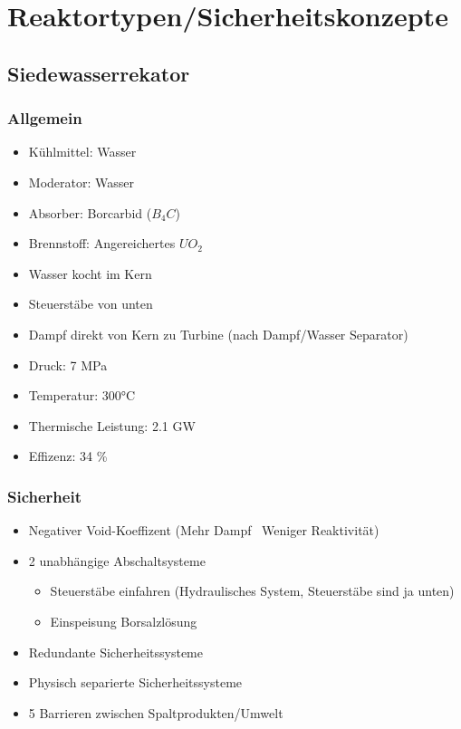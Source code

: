 \documentclass[12pt]{article}
\begin{document}
\thispagestyle{empty}

\section{Reaktortypen/Sicherheitskonzepte}

\subsection{Siedewasserrekator}

\subsubsection{Allgemein}
\begin{itemize}[noitemsep]
	\item Kühlmittel: Wasser
	\item Moderator: Wasser
	\item Absorber: Borcarbid (\(B_4C\))
	\item Brennstoff: Angereichertes \(UO_2\)
	\item Wasser kocht im Kern
	\item Steuerstäbe von unten
	\item Dampf direkt von Kern zu Turbine (nach Dampf/Wasser Separator)
	\item Druck: 7 MPa
	\item Temperatur: 300°C
	\item Thermische Leistung: 2.1 GW
	\item Effizenz: 34 \%
\end{itemize}

\subsubsection{Sicherheit}
\begin{itemize}[noitemsep]
	\item Negativer Void-Koeffizent (Mehr Dampf \textrightarrow\ Weniger Reaktivität)
	\item 2 unabhängige Abschaltsysteme
		\begin{itemize}[noitemsep]
			\item Steuerstäbe einfahren (Hydraulisches System, Steuerstäbe sind ja unten)
			\item Einspeisung Borsalzlösung
		\end{itemize}
	\item Redundante Sicherheitssysteme
	\item Physisch separierte Sicherheitssysteme
	\item 5 Barrieren zwischen Spaltprodukten/Umwelt
\end{itemize}
\end{document}
